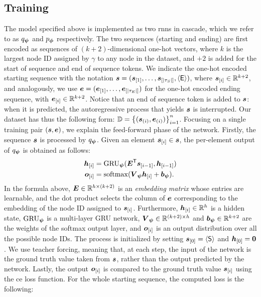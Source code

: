 \subsection{Training}
The model specified above is implemented as two \glspl{rnn} in cascade, which we refer to as $q_{\boldsymbol{\psi}}$ and $p_{\boldsymbol{\phi}}$ respectively. The two sequences (starting and ending) are first encoded as sequences of $(k+2)$-dimensional one-hot vectors, where $k$ is the largest node ID assigned by $\gamma$ to any node in the dataset, and $+2$ is added for the start of sequence and end of sequence tokens. We indicate the one-hot encoded starting sequence with the notation $\Vector{s} = (\Elem{s}{1}, \ldots, \Elem{s}{|\tau_S|}, \EOS)$, where $\Elem{s}{i} \in \Real^{k+2}$, and analogously, we use $\Vector{e} = (\Elem{e}{1}, \ldots, \Elem{e}{|\tau_E|})$ for the one-hot encoded ending sequence, with $\Elem{e}{i} \in \Real^{k+2}$. Notice that an end of sequence token is added to $\Vector{s}$: when it is predicted, the autoregressive process that yields $\Vector{s}$ is interrupted. Our dataset has thus the following form: $\Data = \Set{(\Vector{s}_{(i)}, \Vector{e}_{(i)})}_{i=1}^n$. Focusing on a single training pair $(\Vector{s}, \Vector{e})$, we explain the feed-forward phase of the network. Firstly, the sequence $\Vector{s}$ is processed by $q_{\boldsymbol{\psi}}$. Given an element $\Elem{s}{i} \in \Vector{s}$, the per-element output of $q_{\boldsymbol{\psi}}$ is obtained as follows:
\begin{align*}
    \Elem{h}{i} &= \Op{GRU}_{\EncParam}(\Matrix{E}^{\Transpose}\Elem{s}{i-1}, \Elem{h}{i-1})\\
    \Elem{o}{i} &= \softmax(\Matrix{V}_{\EncParam}\Elem{h}{i} + \Vector{b}_{\EncParam}).
\end{align*}
In the formula above, $\Matrix{E} \in \Real^{h \times (k+2)}$ is an \emph{embedding matrix} whose entries are learnable, and the dot product selects the column of $\Vector{E}$ corresponding to the embedding of the node ID assigned to $\Elem{s}{i}$. Furthermore, $\Elem{h}{i} \in \Real^h$ is a hidden state, $\operatorname{GRU}_{\boldsymbol{\psi}}$ is a multi-layer GRU network, $\Matrix{V}_{\EncParam} \in \Real^{(k+2)\times h}$ and $\Vector{b}_{\EncParam} \in \Real^{k+2}$ are the weights of the softmax output layer, and $\Elem{o}{i}$ is an output distribution over all the possible node IDs. The process is initialized by setting $\Elem{s}{0} = \SOS$ and $\Elem{h}{0} = \Zeros$. We use teacher forcing, meaning that, at each step, the input of the network is the ground truth value taken from $\Vector{s}$, rather than the output predicted by the network. Lastly, the output $\Elem{o}{i}$ is compared to the ground truth value $\Elem{s}{i}$ using the \gls{ce} loss function. For the whole starting sequence, the computed loss is the following:
